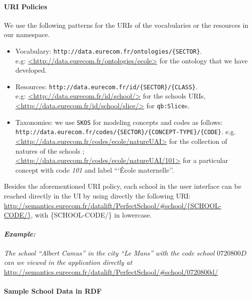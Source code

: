 \paragraph{URI Policies}
We use the following patterns for the URIs of the vocabularies or the resources in our namespace.
\begin{itemize}
\item Vocabulary: \texttt{http://data.eurecom.fr/ontologies/\{SECTOR\}}. \\
e.g: \url{<http://data.eurecom.fr/ontologies/ecole>} for the ontology that we have developed.

\item Resources: \texttt{http://data.eurecom.fr/id/\{SECTOR\}/\{CLASS\}}. \\
e.g: \url{<http://data.eurecom.fr/id/school/>} for the schools URIs, \\
\url{<http://data.eurecom.fr/id/school/slice/>} for \texttt{qb:Slice}s.

\item Taxonomies: we use \texttt{SKOS} for modeling concepts and codes as follows: \\
\texttt{http://data.eurecom.fr/codes/\{SECTOR\}/\{CONCEPT-TYPE\}/\{CODE\}}.
e.g. \url{<http://data.eurecom.fr/codes/ecole/natureUAI>} for the collection of natures of the schools ; \\
        \url{<http://data.eurecom.fr/codes/ecole/natureUAI/101>} for a particular concept with code \textit{101} and label ```\'{E}cole maternelle''.

\end{itemize}

Besides the aforementioned URI policy, each school in the user interface can be reached directly in the UI by using directly the following URI:
 \url{http://semantics.eurecom.fr/datalift/PerfectSchool/\#school/{SCHOOL-CODE/}}, with \{SCHOOL-CODE/\} in lowercase.

\paragraph{\textit{Example:}}
\textit{The school ``Albert Camus'' in the city ``Le Mans'' with the code school $0720800D$ can we viewed in the application directly at} \url{http://semantics.eurecom.fr/datalift/PerfectSchool/\#school/0720800d/}

\paragraph{Sample School Data in RDF }

